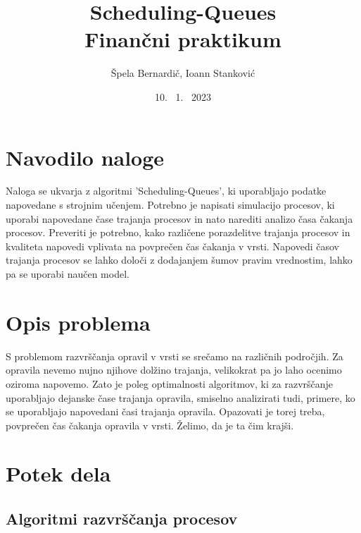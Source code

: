\documentclass[a4paper, pt14]{article}
\begin{document}
\title{%
Scheduling-Queues\\
  \large Finančni praktikum}
\author{Špela Bernardič, Ioann Stanković}
\date{10. \ 1. \ 2023}

\maketitle






\section{Navodilo naloge}
Naloga se ukvarja z algoritmi 'Scheduling-Queues', ki uporabljajo podatke napovedane s strojnim učenjem.
Potrebno je napisati simulacijo procesov, ki uporabi napovedane čase trajanja procesov in nato narediti analizo časa čakanja procesov.
Preveriti je potrebno, kako različene porazdelitve trajanja procesov in kvaliteta napovedi vplivata na povprečen čas čakanja v vrsti.
Napovedi časov trajanja procesov se lahko določi z dodajanjem šumov pravim vrednostim, lahko pa se uporabi naučen model.


\section{Opis problema}

S problemom razvrščanja opravil v vrsti se srečamo na različnih področjih. Za opravila nevemo nujno njihove dolžino trajanja, velikokrat pa jo laho ocenimo oziroma napovemo. 
Zato je poleg optimalnosti algoritmov, ki za razvrščanje uporabljajo dejanske čase trajanja opravila, smiselno analizirati tudi, primere, ko se uporabljajo napovedani časi trajanja opravila.
Opazovati je torej treba, povprečen čas čakanja opravila v vrsti. Želimo, da je ta čim krajši.

\section{Potek dela}
\subsection{Algoritmi razvrščanja procesov}
\end{document}
